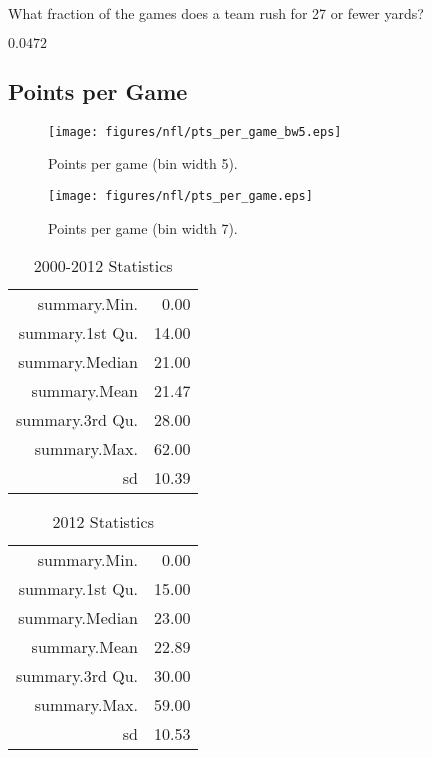 \documentclass{exam}
\begin{document}
  What fraction of the games does a team rush for 27 or fewer yards?
  \begin{solution}
    $0.0472$
  \end{solution}

  \subsection{Points per Game}

  \begin{figure}[H]
    \centering
    \texttt{[image: figures/nfl/pts\_per\_game\_bw5.eps]}
    \caption{Points per game (bin width 5).}
  \end{figure}
  
  \begin{figure}[H]
    \centering
    \texttt{[image: figures/nfl/pts\_per\_game.eps]}
    \caption{Points per game (bin width 7).}
  \end{figure}

  \begin{table}[H]
    \centering
    \begin{tabular}{rr}
      \toprule
      summary.Min.    & 0.00 \\
      summary.1st Qu. & 14.00 \\
      summary.Median  & 21.00 \\
      summary.Mean    & 21.47 \\
      summary.3rd Qu. & 28.00 \\
      summary.Max.    & 62.00 \\
      sd              & 10.39 \\
      \bottomrule
    \end{tabular}
    \caption{2000-2012 Statistics}
  \end{table}

  \begin{table}[H]
    \centering
    \begin{tabular}{rr}
      \toprule
      summary.Min. & 0.00 \\ 
      summary.1st Qu. & 15.00 \\ 
      summary.Median & 23.00 \\ 
      summary.Mean & 22.89 \\ 
      summary.3rd Qu. & 30.00 \\ 
      summary.Max. & 59.00 \\ 
      sd & 10.53 \\ 
      \bottomrule
    \end{tabular}
    \caption{2012 Statistics}
  \end{table}
\end{document}
